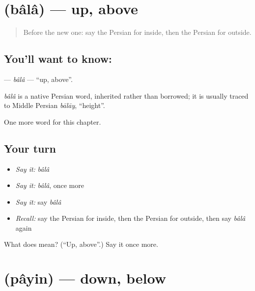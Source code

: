 \section[\texorpdfstring{\fa{بالا} (bâlâ)}{بالا (bâlâ)}]{ (bâlâ) — up, above}

\label{lesson:FA-C68-bala}



\begin{quote}
Before the new one: say the Persian for inside, then the Persian for outside.
\end{quote}

\subsection*{You'll want to know: }
\textbf{} — \emph{bâlâ} — \textquotedblleft{}up, above\textquotedblright{}.

\begin{cousinweb}
\emph{bâlâ} is a native Persian word, inherited rather than borrowed; it is usually traced to Middle Persian \emph{bālāy}, \textquotedblleft{}height\textquotedblright{}.
\end{cousinweb}

\begin{grammarlens}[title={What you've built}]
One more word for this chapter.
\end{grammarlens}

\subsection*{Your turn}
\begin{itemize}
\raggedright
  \item \emph{Say it:} \emph{bâlâ}
  \item \emph{Say it:} \emph{bâlâ}, once more
  \item \emph{Say it:} say \emph{bâlâ}
  \item \emph{Recall:} say the Persian for inside, then the Persian for outside, then say \emph{bâlâ} again
\end{itemize}

\begin{tcolorbox}[breakable,colback=teal!4,colframe=teal!35!black,title={Before you move on}]
What does  mean? (\textquotedblleft{}Up, above\textquotedblright{}.) Say it once more.
\end{tcolorbox}
\section[\texorpdfstring{\fa{پایین} (pâyin)}{پایین (pâyin)}]{ (pâyin) — down, below}

